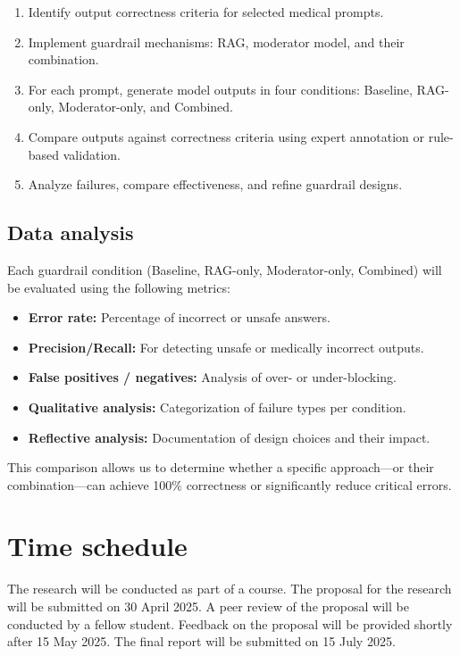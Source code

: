 \documentclass[a4paper,doc,natbib]{apa6}
\begin{document}
    \begin{enumerate}
        \item Identify output correctness criteria for selected medical prompts.
        \item Implement guardrail mechanisms: RAG, moderator model, and their combination.
        \item For each prompt, generate model outputs in four conditions: Baseline, RAG-only, Moderator-only, and Combined.
        \item Compare outputs against correctness criteria using expert annotation or rule-based validation.
        \item Analyze failures, compare effectiveness, and refine guardrail designs.
    \end{enumerate}

    \subsection{Data analysis}

    Each guardrail condition (Baseline, RAG-only, Moderator-only, Combined) will be evaluated using the following metrics:

    \begin{itemize}
        \item \textbf{Error rate:} Percentage of incorrect or unsafe answers.
        \item \textbf{Precision/Recall:} For detecting unsafe or medically incorrect outputs.
        \item \textbf{False positives / negatives:} Analysis of over- or under-blocking.
        \item \textbf{Qualitative analysis:} Categorization of failure types per condition.
        \item \textbf{Reflective analysis:} Documentation of design choices and their impact.
    \end{itemize}

    This comparison allows us to determine whether a specific approach—or their combination—can achieve 100\% correctness or significantly reduce critical errors.

    \section{Time schedule}

    The research will be conducted as part of a course. The proposal for the research will be submitted on 30 April 2025. A peer review of the proposal will be conducted by a fellow student. Feedback on the proposal will be provided shortly after 15 May 2025. The final report will be submitted on 15 July 2025.

    
\end{document}
